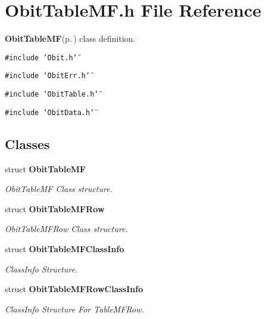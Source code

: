 \section{Obit\-Table\-MF.h File Reference}
\label{ObitTableMF_8h}
{\bf Obit\-Table\-MF}{\rm (p.\,\pageref{structObitTableMF})} class definition. 

{\tt \#include \char`\"{}Obit.h\char`\"{}}\par
{\tt \#include \char`\"{}Obit\-Err.h\char`\"{}}\par
{\tt \#include \char`\"{}Obit\-Table.h\char`\"{}}\par
{\tt \#include \char`\"{}Obit\-Data.h\char`\"{}}\par
\subsection*{Classes}
\begin{CompactItemize}
\item 
struct {\bf Obit\-Table\-MF}
\begin{CompactList}\small\item\em Obit\-Table\-MF Class structure. \item\end{CompactList}\item 
struct {\bf Obit\-Table\-MFRow}
\begin{CompactList}\small\item\em Obit\-Table\-MFRow Class structure. \item\end{CompactList}\item 
struct {\bf Obit\-Table\-MFClass\-Info}
\begin{CompactList}\small\item\em Class\-Info Structure. \item\end{CompactList}\item 
struct {\bf Obit\-Table\-MFRow\-Class\-Info}
\begin{CompactList}\small\item\em Class\-Info Structure For Table\-MFRow. \item\end{CompactList}\end{CompactItemize}
